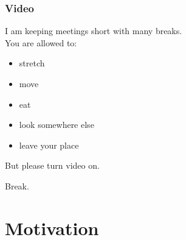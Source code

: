 \begin{assignment}
	\frametitle{Video}
	I am keeping meetings short with many breaks. \\
	You are allowed to:
	\begin{itemize}
		\item stretch
		\item move
		\item eat
		\item look somewhere else
		\item leave your place
	\end{itemize}
	\begin{task}
	But please turn video on.
	\end{task}
\end{assignment}

\begin{assignment}
	\begin{task}
	Break.
	\end{task}
\end{assignment}

\section{Motivation}
